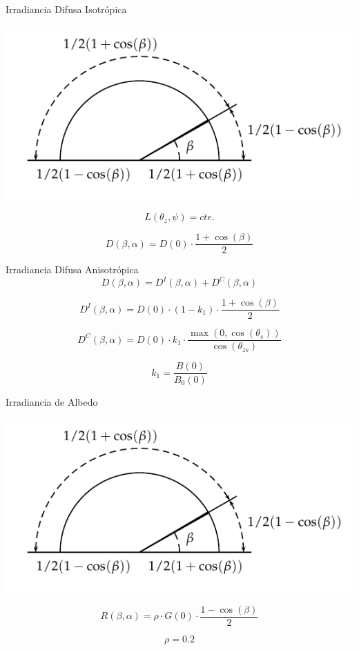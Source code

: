 \documentclass[xcolor={usenames,svgnames,dvipsnames}]{beamer}
\begin{document}
\begin{frame}[label={sec:org5aa327f}]{Irradiancia Difusa Isotrópica}
\begin{center}
\includegraphics[width=.9\linewidth]{../figs/AnguloVisionCielo.pdf}
\end{center}


\[L(\theta_{z},\psi)=cte.\]

\[D(\beta,\alpha)=D(0)\cdot\frac{1+\cos(\beta)}{2}\]
\end{frame}
\begin{frame}[label={sec:org56cdf08}]{Irradiancia Difusa Anisotrópica}
\[D(\beta,\alpha) = D^{I}(\beta,\alpha)+D^{C}(\beta,\alpha)\]

\[D^{I}(\beta,\alpha) = D(0) \cdot (1-k_{1}) \cdot \frac{1 + \cos(\beta)}{2}\]

\[D^{C}(\beta,\alpha) = D(0) \cdot k_{1} \cdot \frac{\max(0,\cos(\theta_{s}))}{\cos(\theta_{zs})}\]

\[k_{1} = \frac{B(0)}{B_{0}(0)}\]
\end{frame}

\begin{frame}[label={sec:org746404d}]{Irradiancia de Albedo}
\begin{center}
\includegraphics[width=.9\linewidth]{../figs/AnguloVisionCielo.pdf}
\end{center}


\[R(\beta,\alpha)=\rho\cdot G(0)\cdot\frac{1-\cos(\beta)}{2}\]

\[\rho=0.2\]
\end{frame}
\end{document}
